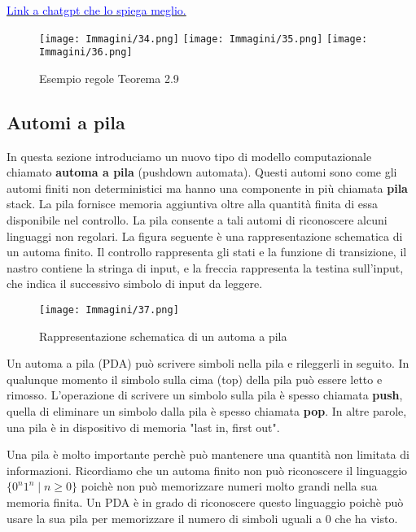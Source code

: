 \documentclass{article}
\begin{document}
\href{https://chatgpt.com/share/6759c2bc-a61c-8011-af18-0db9d52bdd29}{\textcolor{blue}{Link a chatgpt che lo spiega meglio.}}

\begin{figure}[H]
    \centering
    \texttt{[image: Immagini/34.png]}
    \texttt{[image: Immagini/35.png]}
    \texttt{[image: Immagini/36.png]}
    \caption{Esempio regole Teorema 2.9}
    \label{fig:your_image}
\end{figure}

\subsection{Automi a pila}
In questa sezione introduciamo un nuovo tipo di modello computazionale chiamato \textbf{automa a pila} (pushdown automata). Questi automi sono come gli automi finiti non deterministici ma hanno una componente in più chiamata \textbf{pila} stack. La pila fornisce memoria aggiuntiva oltre alla quantità finita di essa disponibile nel controllo. La pila consente a tali automi di riconoscere alcuni linguaggi non regolari.
La figura seguente è una rappresentazione schematica di un automa finito. Il controllo rappresenta gli stati e la funzione di transizione, il nastro contiene la stringa di input, e la freccia rappresenta la testina sull'input, che indica il successivo simbolo di input da leggere.
\begin{figure}[H]
    \centering
    \texttt{[image: Immagini/37.png]}
    \caption{Rappresentazione schematica di un automa a pila}
    \label{fig:pushdown_automaton1}
\end{figure}
Un automa a pila (PDA) può scrivere simboli nella pila e rileggerli in seguito. In qualunque momento il simbolo sulla cima (top) della pila può essere letto e rimosso.
L'operazione di scrivere un simbolo sulla pila è spesso chiamata \textbf{push}, quella di eliminare un simbolo dalla pila è spesso chiamata \textbf{pop}.
In altre parole, una pila è in dispositivo di memoria "last in, first out".

Una pila è molto importante perchè può mantenere una quantità non limitata di informazioni. Ricordiamo che un automa finito non può riconoscere il linguaggio $\{0^n 1^n \mid n \geq 0\}$ poichè non può memorizzare numeri molto grandi nella sua memoria finita. Un PDA è in grado di riconoscere questo linguaggio poichè può usare la sua pila per memorizzare il numero di simboli uguali a 0 che ha visto.
\end{document}
